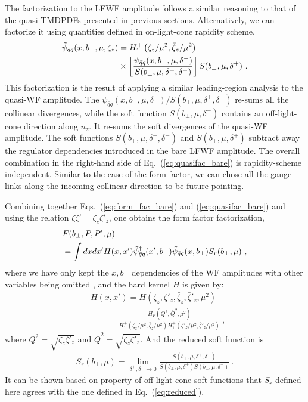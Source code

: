 The factorization to the LFWF amplitude follows a similar reasoning to that of the quasi-TMDPDFs presented in previous sections.  Alternatively, we can factorize it using quantities defined in on-light-cone rapidity scheme,
\begin{align}\label{eq:quasifac_bare}
	\tilde \psi_{\bar q q}(x,b_\perp,\mu,\zeta_z)&=H^+_1\left(\zeta_z/\mu^2,\bar \zeta_z/\mu^2\right)\\ &\times \left[\frac{\psi_{\bar q q}(x,b_\perp,\mu,\delta^-)}{S(b_\perp,\mu,\delta^+,\delta^-)}\right]S(b_\perp,\mu,\delta^+) \ . \nonumber
\end{align}
This factorization is the result of applying a similar leading-region analysis to the quasi-WF amplitude. The $\psi_{\bar q q}(x,b_\perp,\mu,\delta^-)/S(b_\perp,\mu,\delta^+,\delta^-)$ re-sums all the collinear divergences, while the soft function $S(b_\perp,\mu,\delta^+)$ contains an off-light-cone direction along ${n_z}$. It re-sums the soft divergences of the quasi-WF amplitude. The soft functions $S(b_\perp,\mu,\delta^+,\delta^-)$ and $S(b_\perp,\mu,\delta^+)$ subtract away the regulator dependencies introduced in the bare LFWF amplitude. The overall combination in the right-hand side of Eq.~(\ref{eq:quasifac_bare}) is rapidity-scheme independent. Similar to the case of the form factor, we can chose all the gauge-links along the incoming collinear direction to be future-pointing.

Combining together Eqs.~(\ref{eq:form_fac_bare}) and (\ref{eq:quasifac_bare}) and using the relation $\zeta \zeta'= \zeta_z \zeta'_z$,
one obtains the form factor factorization,
\begin{align}
	& F(b_\perp,P,P',\mu)\\
	&= \int dx dx' H(x,x')\tilde \psi_{\bar q q}^{\dagger}(x',b_\perp)\tilde \psi_{\bar q q}(x,b_\perp)S_{r}(b_\perp,\mu)\ ,\nonumber
\end{align}
where we have only kept the $x,b_\perp$ dependencies of the WF amplitudes with other variables being omitted
, and the hard kernel $H$ is given by:
\begin{align}
	&H(x,x')=H(\zeta_z,\zeta'_z,\bar \zeta_z,\bar \zeta'_z,\mu^2)\nonumber \\
	&\qquad=\frac{H_F(Q^2,\bar Q^2,\mu^2)}{H^+_1\left(\zeta_z/\mu^2,\bar \zeta_z/\mu^2\right)H^+_1\left(\zeta'_z/\mu^2,\bar \zeta'_z/\mu^2\right)} \ ,
\end{align}
where $Q^2=\sqrt{\zeta_z\zeta'_z}$ and $\bar Q^2=\sqrt{\bar \zeta_z\bar\zeta'_z}$. And the reduced soft function is
\begin{align}
	S_{r}(b_\perp,\mu)=\lim_{\delta^+,\delta^-\rightarrow 0}\frac{S(b_\perp,\mu,\delta^+,\delta^-)}{S(b_\perp,\mu,\delta^+)S(b_\perp,\mu,\delta^-)} \ .
\end{align}
It can be shown based on property of off-light-cone soft functions that $S_r$ defined here agrees with the one defined in Eq.~(\ref{eq:reduced}).

